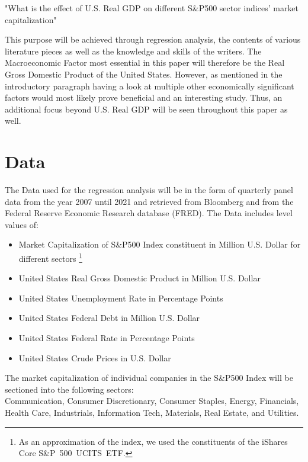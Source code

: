 \documentclass[a4paper,12pt]{article}
\begin{document}
\bigskip

\noindent "What is the effect of U.S. Real GDP on different S\&P500 sector indices' market capitalization"

\bigskip

\noindent This purpose will be achieved through regression analysis, the contents of various literature pieces as well as the knowledge and skills of the writers. The Macroeconomic Factor most essential in this paper will therefore be the Real Gross Domestic Product of the United States. However, as mentioned in the introductory paragraph having a look at multiple other economically significant factors would most likely prove beneficial and an interesting study. Thus, an additional focus beyond U.S. Real GDP will be seen throughout this paper as well.


\clearpage
\section{Data}

The Data used for the regression analysis will be in the form of quarterly panel data from the year 2007 until 2021 and retrieved from Bloomberg and from the Federal Reserve Economic Research database (FRED). The Data includes level values of:

\begin{itemize}
  \item Market Capitalization of S\&P500 Index constituent in Million U.S. Dollar for different sectors \footnote{As an approximation of the index, we used the constituents of the iShares Core S\&P 500 UCITS ETF.}
  \item United States Real Gross Domestic Product in Million U.S. Dollar
  \item United States Unemployment Rate in Percentage Points
  \item United States Federal Debt in Million U.S. Dollar
  \item United States Federal Rate in Percentage Points
  \item United States Crude Prices in U.S. Dollar
\end{itemize}

\noindent The market capitalization of individual companies in the S\&P500 Index will be sectioned into the following sectors:\\
Communication, Consumer Discretionary, Consumer Staples, Energy, Financials, Health Care, Industrials, Information Tech, Materials, Real Estate, and Utilities.
\end{document}
